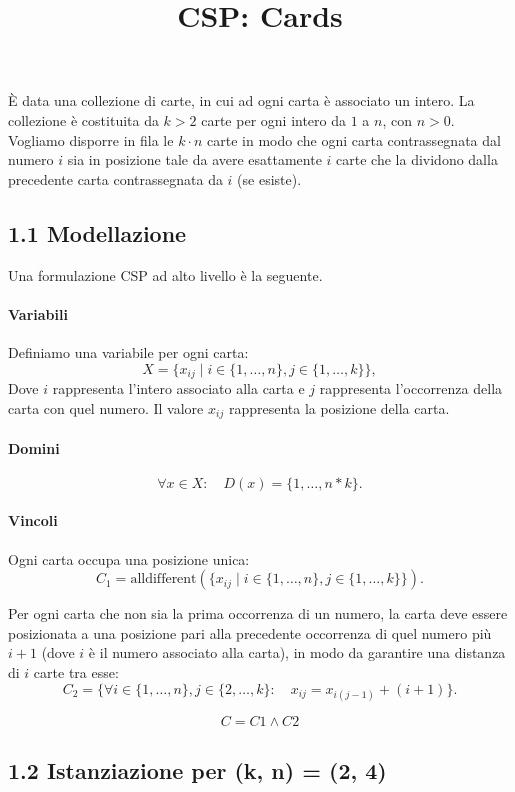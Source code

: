 \documentclass[a4paper,11pt]{article}
\title{CSP: Cards}
\date{}
\begin{document}
\maketitle

È data una collezione di carte, in cui ad ogni carta è associato un intero.
La collezione è costituita da $k > 2$ carte per ogni intero da $1$ a $n$, con $n > 0$.
Vogliamo disporre in fila le $k \cdot n$ carte in modo che ogni carta contrassegnata dal numero $i$ sia in posizione tale da avere esattamente $i$ carte che la dividono dalla precedente carta contrassegnata da $i$ (se esiste).


\subsection*{1.1 Modellazione} 
Una formulazione CSP ad alto livello è la seguente.

\paragraph{Variabili}
Definiamo una variabile per ogni carta:
\[
X = \{x_{ij} \mid i \in \{1, \ldots, n\}, j \in \{1, \ldots, k\}\},
\]
Dove $i$ rappresenta l'intero associato alla carta e $j$ rappresenta l'occorrenza della carta con quel numero.
Il valore $x_{ij}$ rappresenta la posizione della carta.
\paragraph{Domini}
\[
\forall x \in X:\quad D(x)=\{1,\ldots,n*k\}.
\]

\paragraph{Vincoli}

Ogni carta occupa una posizione unica:
\[
C_1 = \text{alldifferent}(\{x_{ij} \mid i \in \{1, \ldots, n\}, j \in \{1, \ldots, k\}\}).
\]

Per ogni carta che non sia la prima occorrenza di un numero, la carta deve essere posizionata a una posizione pari alla precedente occorrenza di quel numero più $i+1$ (dove $i$ è il numero associato alla carta), in modo da garantire una distanza di $i$ carte tra esse:
\[
C_2 = \{\forall i \in \{1, \ldots, n\}, j \in \{2, \ldots, k\}:\quad x_{ij} = x_{i(j-1)} + (i+1)\}.
\]


\[
C = C1 \land C2
\]

\newpage

\subsection*{1.2 Istanziazione per (k, n) = (2, 4)}
\end{document}
